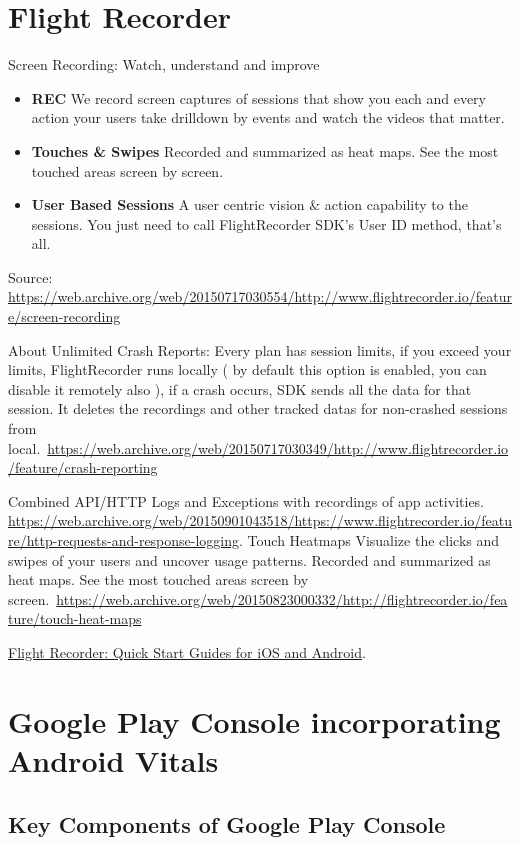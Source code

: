 \section{Flight Recorder}
Screen Recording: 
Watch, understand and improve
\begin{itemize}
    \item \textbf{REC} We record screen captures of sessions that show you each and every action your users take drilldown by events and watch the videos that matter.
    \item \textbf{Touches \& Swipes} Recorded and summarized as heat maps. See the most touched areas screen by screen.
    \item \textbf{User Based Sessions} A user centric vision \& action capability to the sessions. You just need to call FlightRecorder SDK's User ID method, that's all.
\end{itemize}
Source: \url{https://web.archive.org/web/20150717030554/http://www.flightrecorder.io/feature/screen-recording}

About Unlimited Crash Reports: 
Every plan has session limits, if you exceed your limits, FlightRecorder runs locally ( by default this option is enabled, you can disable it remotely also ), if a crash occurs, SDK sends all the data for that session. It deletes the recordings and other tracked datas for non-crashed sessions from local.~\url{https://web.archive.org/web/20150717030349/http://www.flightrecorder.io/feature/crash-reporting}

Combined API/HTTP Logs and Exceptions with recordings of app activities. \url{https://web.archive.org/web/20150901043518/https://www.flightrecorder.io/feature/http-requests-and-response-logging}. Touch Heatmaps
Visualize the clicks and swipes of your users and uncover usage patterns. Recorded and summarized as heat maps. See the most touched areas screen by screen.~\url{https://web.archive.org/web/20150823000332/http://flightrecorder.io/feature/touch-heat-maps}

\href{https://web.archive.org/web/20151104224311/http://help.flightrecorder.co/quick-start/}{Flight Recorder: Quick Start Guides for iOS and Android}.

\section{Google Play Console incorporating Android Vitals}\label{google_play_console_section}

\subsection{Key Components of Google Play Console}
